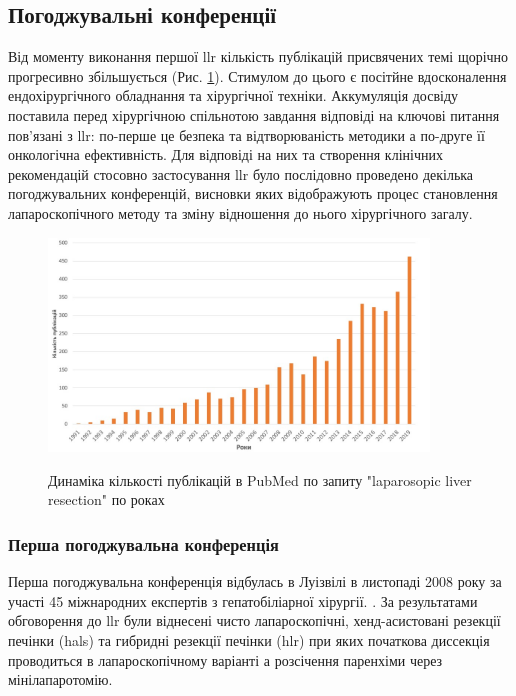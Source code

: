 \begin{refsection}
\subsection{Погоджувальні конференції}

Від моменту виконання першої \acrshort{llr} кількість публікацій присвячених темі щорічно прогресивно збільшується (Рис. \ref{fig:plot1}). Стимулом до цього є посітйне вдосконалення ендохірургічного обладнання та хірургічної техніки.
Аккумуляція досвіду поставила перед хірургічною спільнотою завдання відповіді на ключові питання пов'язані з \acrshort{llr}: по-перше це безпека та відтворюваність методики а по-друге її онкологічна ефективність. Для відповіді на них та створення клінічних рекомендацій стосовно застосування \acrshort{llr} було послідовно проведено декілька погоджувальних конференцій, висновки яких відображують процес становлення лапароскопічного методу та зміну відношення до нього хірургічного загалу. 

\begin{figure}[h]
\caption{Динаміка кількості публікацій в PubMed по запиту "laparosopic liver resection" по роках}
\centering
\includegraphics[width=0.9\textwidth]{Illustrations/Pic_01.jpg}
\label{fig:plot1}
\end{figure}

\subsubsection{Перша погоджувальна конференція} 

Перша погоджувальна конференція відбулась в Луізвілі в листопаді 2008 року за участі 45 міжнародних експертів з гепатобіліарної хірургії. \cite{Buell2009}. За результатами обговорення до  \acrshort{llr} були віднесені чисто лапароскопічні, хенд-асистовані резекції печінки (\acrshort{hals}) та гибридні резекції печінки (\acrshort{hlr}) при яких початкова диссекція проводиться в лапароскопічному варіанті а розсічення паренхіми через мінілапаротомію. 


\end{refsection}
